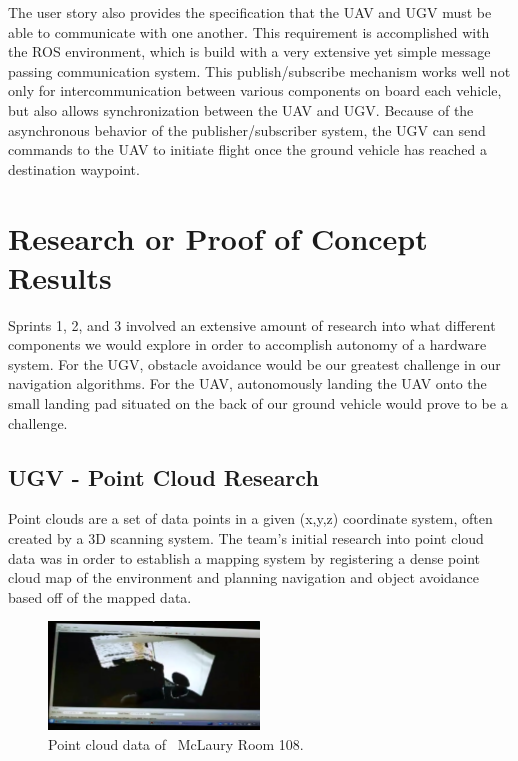 The user story also provides the specification that the UAV and UGV must be able to communicate with one another. This requirement is accomplished with the ROS environment, which is build with a very extensive yet simple message passing communication system. This publish/subscribe mechanism works well not only for intercommunication between various components on board each vehicle, but also allows synchronization between the UAV and UGV. Because of the asynchronous behavior of the publisher/subscriber system, the UGV can send commands to the UAV to initiate flight once the ground vehicle has reached a destination waypoint.




\section{Research or Proof of Concept Results}
Sprints 1, 2, and 3 involved an extensive amount of research into what different components we would explore in order to accomplish autonomy of a hardware system. For the UGV, obstacle avoidance would be our greatest challenge in our navigation algorithms. For the UAV, autonomously landing the UAV onto the small landing pad situated on the back of our ground vehicle would prove to be a challenge.

\subsection{UGV - Point Cloud Research}
Point clouds are a set of data points in a given (x,y,z) coordinate system, often created by a 3D scanning system. The team's initial research into point cloud data was in order to establish a mapping system by registering a dense point cloud map of the environment and planning navigation and object avoidance based off of the mapped data. 

\begin{figure}[!h]
\begin{center}
\includegraphics[width=0.5\textwidth]{resources/img/point_cloud}
\end{center}
\caption{Point cloud data of \ McLaury Room 108.\label{pointcloud108}}
\end{figure}

